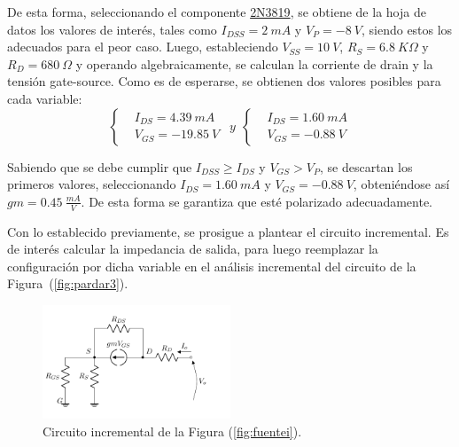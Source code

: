 De esta forma, seleccionando el componente \href{https://www.onsemi.com/pub/Collateral/2N3819-D.PDF}{2N3819}, se obtiene de la hoja de datos los valores de interés, tales como $I_{DSS} = 2 \ mA$ y $V_P = -8 \ V$, siendo estos los adecuados para el peor caso. Luego, estableciendo $V_{SS} = 10 \ V$, $R_S = 6.8 \ K\Omega$ y $R_D = 680 \ \Omega$ y operando algebraicamente, se calculan la corriente de drain y la tensión gate-source. Como es de esperarse, se obtienen dos valores posibles para cada variable:
\begin{equation*}
\left\lbrace
\begin{split}
	&I_{DS} =  4.39 \ mA \\
	&V_{GS} =  -19.85 \ V
\end{split}
\right.
\ \ y \ \
\left\lbrace
\begin{split}
	&I_{DS} =  1.60 \ mA \\
	&V_{GS} =  -0.88 \ V
\end{split}
\right.
\end{equation*}

Sabiendo que se debe cumplir que $I_{DSS} \geq I_{DS}$ y $V_{GS} > V_{P}$, se descartan los primeros valores, seleccionando $I_{DS} = 1.60 \ mA$ y $V_{GS} = -0.88 \ V$, obteniéndose así $gm = 0.45 \ \frac{mA}{V}$. De esta forma se garantiza que esté polarizado adecuadamente. 

Con lo establecido previamente, se prosigue a plantear el circuito incremental. Es de interés calcular la impedancia de salida, para luego reemplazar la configuración por dicha variable en el análisis incremental del circuito de la Figura~(\ref{fig:pardar3}).
\begin{figure}[H]
\centering
	\includegraphics[width=0.5\textwidth, page=1]{Imagenes/ModeloIncremental.pdf}
	\caption{Circuito incremental de la Figura (\ref{fig:fuentei}).}
\label{fig:incfuente1}
\end{figure}

